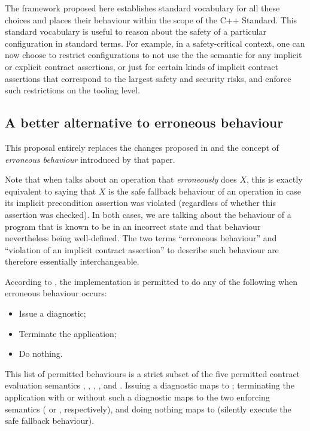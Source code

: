 The framework proposed here establishes standard vocabulary for all these choices and places their behaviour within the scope of the C++ Standard. This standard vocabulary is useful to reason about the safety of a particular configuration in standard terms. For example, in a safety-critical context, one can now choose to restrict configurations to not use the  the semantic for any implicit or explicit contract assertions, or just for certain kinds of implicit contract assertions that correspond to the largest safety and security risks, and enforce such restrictions on the tooling level.

\subsection{A better alternative to erroneous behaviour}
\label{subsec:erroneous}

This proposal entirely replaces the changes proposed in \cite{P2795R5} and the concept of \emph{erroneous behaviour} introduced by that paper.

Note that when \cite{P2795R5} talks about an operation that \emph{erroneously} does $X$, this is exactly equivalent to saying that $X$ is the safe fallback behaviour of an operation in case its implicit precondition assertion was violated (regardless of whether this assertion was checked). In both cases, we are talking about the behaviour of a program that is known to be in an incorrect state and that behaviour nevertheless being well-defined. The two terms ``erroneous behaviour'' and ``violation of an implicit contract assertion'' to describe such behaviour are therefore essentially interchangeable.


According to \cite{P2795R5}, the implementation is permitted to do any of the following when erroneous behaviour occurs:
\begin{itemize}
\item Issue a diagnostic; 
\item Terminate the application; 
\item Do nothing.
\end{itemize}
This list of permitted behaviours is a strict subset of the five permitted contract evaluation semantics , , , , and . Issuing a diagnostic maps to ; terminating the application with or without such a diagnostic maps to the two enforcing semantics ( or , respectively), and doing nothing maps to  (silently execute the safe fallback behaviour).

